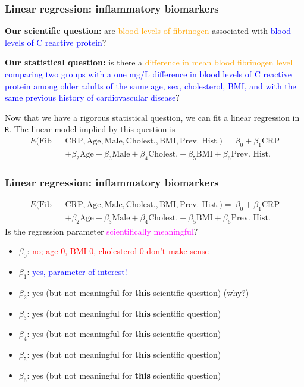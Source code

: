 \documentclass[12pt, 
hyperref={colorlinks=true, linkcolor=blue, urlcolor=cyan},dvipsnames]{beamer}
\begin{document}
\begin{frame}
\frametitle{Linear regression: inflammatory biomarkers}
\textbf{Our scientific question:} are \textcolor{orange}{blood levels of fibrinogen} associated with \textcolor{blue}{blood levels of C reactive protein}?

\textbf{Our statistical question:} is there a \textcolor{orange}{difference in mean blood fibrinogen level} \textcolor{blue}{comparing two groups with a one mg/L difference in blood levels of C reactive protein among older adults of the same age, sex, cholesterol, BMI, and with the same previous history of cardiovascular disease}?

Now that we have a rigorous statistical question, we can fit a linear regression in \texttt{R}. The linear model implied by this question is
\begin{align*}
E(\text{Fib} \mid & \text{CRP}, \text{Age}, \text{Male}, \text{Cholest.}, \text{BMI}, \text{Prev. Hist.}) =  \ \beta_0 + \beta_1 \text{CRP} \\
&+ \beta_2 \text{Age}  + \beta_3 \text{Male} + \beta_4 \text{Cholest.} + \beta_5 \text{BMI} + \beta_6 \text{Prev. Hist.}
\end{align*}
\end{frame}

\begin{frame}
\frametitle{Linear regression: inflammatory biomarkers}
{\small 
\begin{align*}
E(\text{Fib} \mid & \text{CRP}, \text{Age}, \text{Male}, \text{Cholest.}, \text{BMI}, \text{Prev. Hist.}) =  \ \beta_0 + \beta_1 \text{CRP} \\
&+ \beta_2 \text{Age}  + \beta_3 \text{Male} + \beta_4 \text{Cholest.} + \beta_5 \text{BMI} + \beta_6 \text{Prev. Hist.}
\end{align*}
}
Is the regression parameter \textcolor{magenta}{scientifically meaningful}? \vspace{-0.3cm}
\begin{itemize}
\item $\beta_0$: \pause \textcolor{red}{no; age 0, BMI 0, cholesterol 0 don't make sense}
\item $\beta_1$: \pause \textcolor{blue}{yes, parameter of interest!}
\item $\beta_2$: \pause yes (but not meaningful for \textbf{this} scientific question) (why?)
\item $\beta_3$: yes (but not meaningful for \textbf{this} scientific question)
\item $\beta_4$: yes (but not meaningful for \textbf{this} scientific question)
\item $\beta_5$: yes (but not meaningful for \textbf{this} scientific question)
\item $\beta_6$: yes (but not meaningful for \textbf{this} scientific question)
\end{itemize} 

\end{frame}
\end{document}
